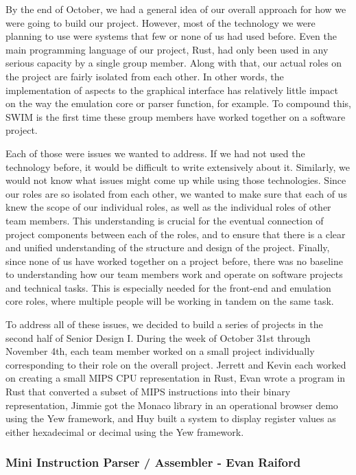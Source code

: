 \documentclass[
    paper=letter,
    parskip=half,
    fontsize=12pt,
    titlepage=firstiscover,
    toc=bibliography,
    numbers=endperiod
]{scrartcl}
\begin{document}
By the end of October, we had a general idea of our overall approach for
how we were going to build our project. However, most of the technology
we were planning to use were systems that few or none of us had used
before. Even the main programming language of our project, Rust, had
only been used in any serious capacity by a single group member. Along
with that, our actual roles on the project are fairly isolated from each
other. In other words, the implementation of aspects to the graphical
interface has relatively little impact on the way the emulation core or
parser function, for example. To compound this, SWIM is the first time
these group members have worked together on a software project.

Each of those were issues we wanted to address. If we had not used the
technology before, it would be difficult to write extensively about it.
Similarly, we would not know what issues might come up while using those
technologies. Since our roles are so isolated from each other, we wanted
to make sure that each of us knew the scope of our individual roles, as
well as the individual roles of other team members. This understanding
is crucial for the eventual connection of project components between
each of the roles, and to ensure that there is a clear and unified
understanding of the structure and design of the project. Finally, since
none of us have worked together on a project before, there was no
baseline to understanding how our team members work and operate on
software projects and technical tasks. This is especially needed for the
front-end and emulation core roles, where multiple people will be
working in tandem on the same task.

To address all of these issues, we decided to build a series of projects
in the second half of Senior Design I. During the week of October 31st
through November 4th, each team member worked on a small project
individually corresponding to their role on the overall project. Jerrett
and Kevin each worked on creating a small MIPS CPU representation in
Rust, Evan wrote a program in Rust that converted a subset of MIPS
instructions into their binary representation, Jimmie got the Monaco
library in an operational browser demo using the Yew framework, and Huy
built a system to display register values as either hexadecimal or
decimal using the Yew framework.

\subsubsection{Mini Instruction Parser / Assembler - Evan Raiford}
\end{document}
